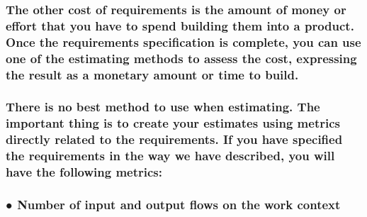 \documentclass[
]{article}
\begin{document}
\hypertarget{the-other-cost-of-requirements-is-the-amount-of-money-or-effort-that-you-have-to-spend-building-them-into-a-product.-once-the-requirements-specification-is-complete-you-can-use-one-of-the-estimating-methods-to-assess-the-cost-expressing-the-result-as-a-monetary-amount-or-time-to-build.}{%
\subsubsection{\texorpdfstring{The other cost of requirements is the
amount of money or effort that you have to spend building them into a
product. Once the requirements specification is complete, you can use
one of the estimating methods to assess the cost, expressing the result
as a monetary amount or time to build.
}{The other cost of requirements is the amount of money or effort that you have to spend building them into a product. Once the requirements specification is complete, you can use one of the estimating methods to assess the cost, expressing the result as a monetary amount or time to build. }}\label{the-other-cost-of-requirements-is-the-amount-of-money-or-effort-that-you-have-to-spend-building-them-into-a-product.-once-the-requirements-specification-is-complete-you-can-use-one-of-the-estimating-methods-to-assess-the-cost-expressing-the-result-as-a-monetary-amount-or-time-to-build.}}

\hypertarget{there-is-no-best-method-to-use-when-estimating.-the-important-thing-is-to-create-your-estimates-using-metrics-directly-related-to-the-requirements.-if-you-have-specified-the-requirements-in-the-way-we-have-described-you-will-have-the-following-metrics}{%
\subsubsection{There is no best method to use when estimating. The
important thing is to create your estimates using metrics directly
related to the requirements. If you have specified the requirements in
the way we have described, you will have the following
metrics:}\label{there-is-no-best-method-to-use-when-estimating.-the-important-thing-is-to-create-your-estimates-using-metrics-directly-related-to-the-requirements.-if-you-have-specified-the-requirements-in-the-way-we-have-described-you-will-have-the-following-metrics}}

\hypertarget{number-of-input-and-output-flows-on-the-work-context}{%
\subsubsection{● Number of input and output flows on the work
context}\label{number-of-input-and-output-flows-on-the-work-context}}
\end{document}
